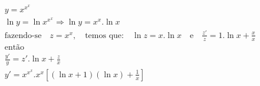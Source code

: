 \begin{ex}
\begin{align}
&y=x^{x^{x}}\nonumber\\
&\ln{y}=\ln{x^{x^{x}}} \Rightarrow \ln{y}=x^{x}.\ln{x}\nonumber\\
&\text{fazendo-se}\quad z=x^x,\quad \text{temos que:}\quad \ln{z}=x.\ln{x}\quad\text{e}\quad \frac{z'}{z}=1.\ln{x}+\frac{x}{x}\nonumber\\
&\text{então}\nonumber\\
&\frac{y'}{y}=z'.\ln{x}+\frac{z}{x}\nonumber\\
&y'=x^{x^{x}}.x^x\left[(\ln{x}+1)(\ln{x})+\frac{1}{x}\right]\nonumber
\end{align}
\end{ex}